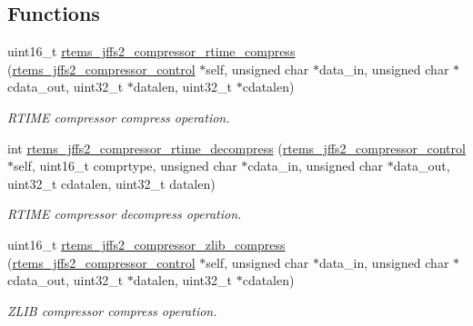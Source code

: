 \subsection*{Functions}
\begin{DoxyCompactItemize}
\item 
\mbox{\label{group__JFFS2_ga2779523833441c943d39987446552fd6}} 
uint16\+\_\+t \mbox{\hyperlink{group__JFFS2_ga2779523833441c943d39987446552fd6}{rtems\+\_\+jffs2\+\_\+compressor\+\_\+rtime\+\_\+compress}} (\mbox{\hyperlink{structrtems__jffs2__compressor__control}{rtems\+\_\+jffs2\+\_\+compressor\+\_\+control}} $\ast$self, unsigned char $\ast$data\+\_\+in, unsigned char $\ast$cdata\+\_\+out, uint32\+\_\+t $\ast$datalen, uint32\+\_\+t $\ast$cdatalen)
\begin{DoxyCompactList}\small\item\em R\+T\+I\+ME compressor compress operation. \end{DoxyCompactList}\item 
\mbox{\label{group__JFFS2_ga052f4d3275e57586b742d10b600a1cac}} 
int \mbox{\hyperlink{group__JFFS2_ga052f4d3275e57586b742d10b600a1cac}{rtems\+\_\+jffs2\+\_\+compressor\+\_\+rtime\+\_\+decompress}} (\mbox{\hyperlink{structrtems__jffs2__compressor__control}{rtems\+\_\+jffs2\+\_\+compressor\+\_\+control}} $\ast$self, uint16\+\_\+t comprtype, unsigned char $\ast$cdata\+\_\+in, unsigned char $\ast$data\+\_\+out, uint32\+\_\+t cdatalen, uint32\+\_\+t datalen)
\begin{DoxyCompactList}\small\item\em R\+T\+I\+ME compressor decompress operation. \end{DoxyCompactList}\item 
\mbox{\label{group__JFFS2_ga6ed59e494e655bd21dc6608184618154}} 
uint16\+\_\+t \mbox{\hyperlink{group__JFFS2_ga6ed59e494e655bd21dc6608184618154}{rtems\+\_\+jffs2\+\_\+compressor\+\_\+zlib\+\_\+compress}} (\mbox{\hyperlink{structrtems__jffs2__compressor__control}{rtems\+\_\+jffs2\+\_\+compressor\+\_\+control}} $\ast$self, unsigned char $\ast$data\+\_\+in, unsigned char $\ast$cdata\+\_\+out, uint32\+\_\+t $\ast$datalen, uint32\+\_\+t $\ast$cdatalen)
\begin{DoxyCompactList}\small\item\em Z\+L\+IB compressor compress operation. \end{DoxyCompactList}\item 

\end{DoxyCompactItemize}
